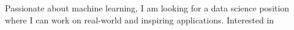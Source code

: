 

\begin{cvparagraph}

Passionate about machine learning, I am looking for a data science position where I can work on real-world and inspiring applications. Interested in 

\end{cvparagraph}
